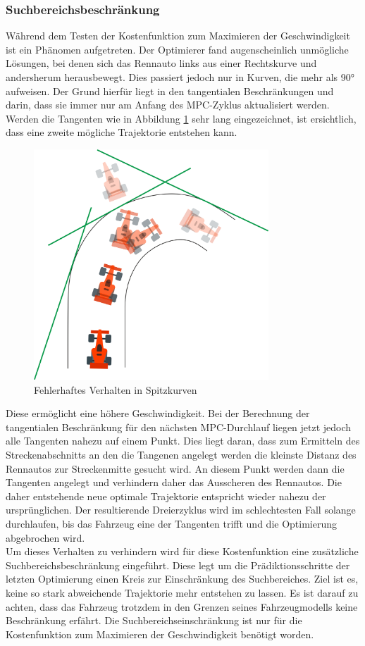 \documentclass{like}
\begin{document}
\subsubsection*{Suchbereichsbeschränkung}
Während dem Testen der Kostenfunktion zum Maximieren der Geschwindigkeit ist ein Phänomen aufgetreten. Der Optimierer fand augenscheinlich unmögliche Lösungen, bei denen sich das Rennauto links aus einer Rechtskurve und andersherum herausbewegt.
Dies passiert jedoch nur in Kurven, die mehr als 90° aufweisen. Der Grund hierfür liegt in den tangentialen Beschränkungen und darin, dass sie immer nur am Anfang des \ac{MPC}-Zyklus aktualisiert werden. Werden die Tangenten wie in Abbildung \ref{fig:curveAnomaly} sehr lang eingezeichnet, ist ersichtlich, dass eine zweite mögliche Trajektorie entstehen kann. 
\begin{figure}[ht!]
	\centering
	\includegraphics[width=250pt]{Abbildungen/curveAnomaly.png}
	\caption{Fehlerhaftes Verhalten in Spitzkurven}
	\label{fig:curveAnomaly}
\end{figure}
Diese ermöglicht eine höhere Geschwindigkeit. Bei der Berechnung der tangentialen Beschränkung für den nächsten \ac{MPC}-Durchlauf liegen jetzt jedoch alle Tangenten nahezu auf einem Punkt. Dies liegt daran, dass zum Ermitteln des Streckenabschnitts an den die Tangenen angelegt werden die kleinste Distanz des Rennautos zur Streckenmitte gesucht wird. An diesem Punkt werden dann die Tangenten angelegt und verhindern daher das Ausscheren des Rennautos. Die daher entstehende neue optimale Trajektorie entspricht wieder nahezu der ursprünglichen. Der resultierende Dreierzyklus wird im schlechtesten Fall solange durchlaufen, bis das Fahrzeug eine der Tangenten trifft und die Optimierung abgebrochen wird.\\
Um dieses Verhalten zu verhindern wird für diese Kostenfunktion eine zusätzliche Such\-be\-reichs\-be\-schrän\-kung eingeführt. Diese legt um die Prädiktionsschritte der letzten Op\-ti\-mie\-rung einen Kreis zur Einschränkung des Suchbereiches. Ziel ist es, keine so stark abweichende Trajektorie mehr entstehen zu lassen. Es ist darauf zu achten, dass das Fahrzeug trotzdem in den Grenzen seines Fahrzeugmodells keine Beschränkung erfährt. Die Suchbereichseinschränkung ist nur für die Kostenfunktion zum Maximieren der Geschwindigkeit benötigt worden.
\end{document}
